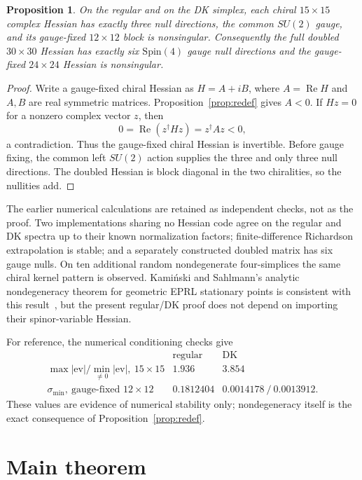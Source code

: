 \documentclass[11pt]{article}
\numberwithin{equation}{section}
\newtheorem{proposition}[theorem]{Proposition}
\theoremstyle{definition}
\theoremstyle{remark}
\newcommand{\SUtwo}{SU(2)}
\newcommand{\SpinFour}{\mathrm{Spin}(4)}
\renewcommand{\Re}{\operatorname{Re}}
\begin{document}
\begin{proposition}\label{prop:hess}
On the regular and on the DK simplex, each chiral $15\times15$ complex Hessian
has exactly three null directions, the common $\SUtwo$ gauge, and its
gauge-fixed $12\times12$ block is nonsingular. Consequently the full doubled
$30\times30$ Hessian has exactly six $\SpinFour$ gauge null directions and the
gauge-fixed $24\times24$ Hessian is nonsingular.
\end{proposition}

\begin{proof}
Write a gauge-fixed chiral Hessian as $H=A+iB$, where
$A=\Re H$ and $A,B$ are real symmetric matrices. Proposition~\ref{prop:redef}
gives $A<0$. If $Hz=0$ for a nonzero complex vector $z$, then
\[
 0=\Re(z^\dagger Hz)=z^\dagger A z<0,
\]
a contradiction. Thus the gauge-fixed chiral Hessian is invertible. Before
gauge fixing, the common left $\SUtwo$ action supplies the three and only three
null directions. The doubled Hessian is block diagonal in the two
chiralities, so the nullities add.
\end{proof}

The earlier numerical calculations are retained as independent checks, not as
the proof. Two implementations sharing no Hessian code agree on the regular
and DK spectra up to their known normalization factors; finite-difference
Richardson extrapolation is stable; and a separately constructed doubled
matrix has six gauge nulls. On ten additional random nondegenerate
four-simplices the same chiral kernel pattern is observed. Kami\'nski and
Sahlmann's analytic nondegeneracy theorem for geometric EPRL stationary points
is consistent with this result~\cite{KaminskiSahlmann2019}, but the present
regular/DK proof does not depend on importing their spinor-variable Hessian.

For reference, the numerical conditioning checks give
\[
\begin{array}{c|cc}
 & \text{regular} & \text{DK}\\ \hline
\max|\mathrm{ev}|/\min_{\ne0}|\mathrm{ev}|,\ 15\times15
 &1.936&3.854\\
\sigma_{\min},\ \text{gauge-fixed }12\times12
 &0.1812404&0.0014178\ /\ 0.0013912 .
\end{array}
\]
These values are evidence of numerical stability only; nondegeneracy itself is
the exact consequence of Proposition~\ref{prop:redef}.

\section{Main theorem}\label{sec:main}
\end{document}
